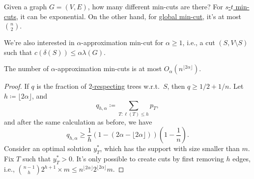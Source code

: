 Given a graph \(G = (V, E)\), how many different min-cuts are there? For \hyperref[prb:s-t-min-cut]{\(s\)-\(t\) min-cuts}, it can be exponential. On the other hand, for \hyperref[prb:global-min-cut]{global min-cut}, it's at most \(\binom{n}{2}\).

We're also interested in \(\alpha \)-approximation min-cut for \(\alpha \geq 1\), i.e., a cut \((S, V \setminus S)\) such that \(c(\delta (S)) \leq \alpha \lambda (G)\).

\begin{theorem}
	The number of \(\alpha \)-approximation min-cuts is at most \(O_\alpha (n^{\lfloor 2\alpha \rfloor })\).
\end{theorem}
\begin{proof}
	If \(q\) is the fraction of \hyperref[def:respecting]{\(2\)-respecting} trees w.r.t.\ \(S\), then \(q \geq 1 / 2 + 1 / n\). Let \(h \coloneqq \lfloor 2 \alpha \rfloor \), and
	\[
		q_{h, \alpha }
		\coloneqq \sum_{T \colon \ell (T) \leq h} p_T,
	\]
	and after the same calculation as before, we have
	\[
		q_{h, \alpha }
		\geq \frac{1}{h} (1 - (2\alpha - \lfloor 2 \alpha \rfloor )) \left( 1 - \frac{1}{n} \right) .
	\]
	Consider an optimal solution \(y^{\ast} _T\), which has the support with size smaller than \(m\). Fix \(T\) such that \(y^{\ast} _T > 0\). It's only possible to create cuts by first removing \(h\) edges, i.e., \(\binom{n-1}{h} 2^{h+1} \times m \leq n^{\lfloor 2\alpha \rfloor } 2^{\lfloor 2\alpha \rfloor }m\).
\end{proof}